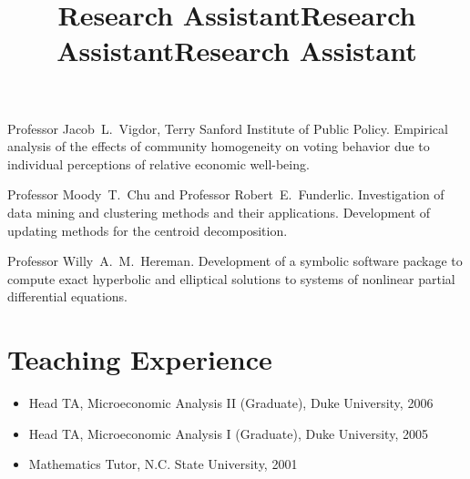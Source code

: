 \documentclass[overlapped,line,final,11pt,letterpaper]{res}
\begin{document}
\begin{resume}
\title{Research Assistant}
\begin{position}
  Professor Jacob\ L.\ Vigdor, Terry Sanford Institute of Public
  Policy.  Empirical analysis of the effects of community homogeneity
  on voting behavior due to individual perceptions of relative
  economic well-being.
\end{position}

\title{Research Assistant}
\begin{position}
  Professor Moody\ T.\ Chu and Professor Robert\ E.\ Funderlic.
  Investigation of data mining and clustering methods and their
  applications. Development of updating methods for the centroid
  decomposition.
\end{position}

\title{Research Assistant}
\begin{position}
  Professor Willy\ A.\ M.\ Hereman. Development of a symbolic software
  package to compute exact hyperbolic and elliptical solutions to
  systems of nonlinear partial differential equations.
\end{position}


\section{\bf Teaching Experience}

\begin{itemize}
\item Head TA, Microeconomic Analysis II (Graduate), Duke University, 2006
\item Head TA, Microeconomic Analysis I (Graduate), Duke University, 2005
\item Mathematics Tutor, N.C. State University, 2001
\end{itemize}


%


\end{resume}
\end{document}
